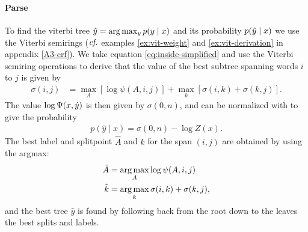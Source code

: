   \paragraph{Parse}
    To find the viterbi tree $\hat{ y } = \arg \max_{ y } p(y  \mid x)$ and its probability $p(\hat{y} \mid x)$ we use the Viterbi semirings ($\emph{cf.}$ examples \ref{ex:vit-weight} and \ref{ex:vit-derivation} in appendix \ref{A3-crf}). We take equation \ref{eq:inside-simplified} and use the Viterbi semiring operations to derive that the value of the best subtree spanning words $i$ to $j$ is given by
    \begin{align}
      \label{eq:viterbi-score}
      \sigma(i,j)
        &= \max_{A} [ \log \psi(A, i, j) ] + \max_{k} [\sigma(i,k) + \sigma(k,j)].
    \end{align}
    The value $\log \Psi(x, \hat{y})$ is then given by $\sigma(0, n)$, and  can be normalized with to give the probability
    \begin{align}
      p(\hat{y} \mid x) = \sigma(0, n) - \log Z(x).
    \end{align}
    The best label and splitpoint $\hat{A}$ and $\hat{k}$ for the span $(i, j)$ are obtained by using the argmax:
    \begin{align}
      \label{eq:viterbi-tree}
      \hat{A} &= \operatorname*{arg\,max}_{ A  } \log \psi(A, i, j)  \\
      \hat{k} &= \operatorname*{arg\,max}_{ k } \sigma(i, k) + \sigma(k, j),
    \end{align}
    and the best tree $\hat{y}$ is found by following back from the root down to the leaves the best splits and labels.

